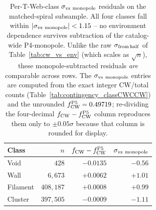 \documentclass[aps,prd,twocolumn,superscriptaddress,showpacs,preprintnumbers,nofootinbib,longbibliography,floatfix]{revtex4-2}
\begin{document}
\begin{table}[ht]
\caption{Per-T-Web-class $\sigma_{\rm vs\ monopole}$ residuals on the
matched-spiral subsample. All four classes fall within
$|\sigma_{\rm vs\ monopole}| < 1.15$ -- no environment dependence
survives subtraction of the catalog-wide P4-monopole. Unlike the raw
$\sigma_{\rm from\,half}$ of Table~\ref{tab:cw_vs_env} (which scales
as $\sqrt{n}$), these monopole-subtracted residuals \emph{are}
comparable across rows. The $\sigma_{\rm vs\ monopole}$ entries are
computed from the exact integer CW/total counts
(Table~\ref{tab:contingency_classCWCCW}) and the unrounded
$f_{\rm CW}^{\rm P5} = 0.49719$; re-dividing the four-decimal
$f_{\rm CW} - f_{\rm CW}^{\rm P5}$ column reproduces them only to
$\pm 0.05\sigma$ because that column is rounded for display.}
\label{tab:p4_monopole_residual}
\begin{ruledtabular}
\begin{tabular}{lrrr}
Class & $n$ & $f_{\rm CW} - f_{\rm CW}^{\rm P5}$ &
$\sigma_{\rm vs\ monopole}$ \\
\hline
Void     & $428$     & $-0.0135$ & $-0.56$ \\
Wall     & $6{,}673$ & $+0.0062$ & $+1.01$ \\
Filament & $408{,}187$ & $+0.0008$ & $+0.99$ \\
Cluster  & $397{,}505$ & $-0.0009$ & $-1.11$ \\
\end{tabular}
\end{ruledtabular}
\end{table}
\end{document}
